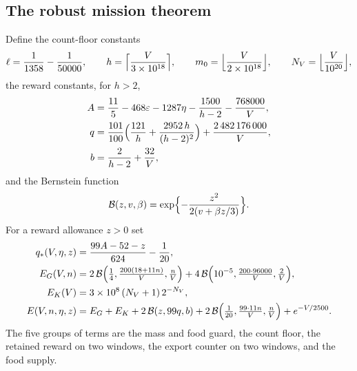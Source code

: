 \documentclass[11pt,letterpaper]{article}
\theoremstyle{plain}
\theoremstyle{definition}
\theoremstyle{remark}
\numberwithin{equation}{section}
\newcommand{\cB}{\mathcal B}
\newcommand{\eps}{\varepsilon}
\begin{document}
\subsection{The robust mission theorem}
Define the count-floor constants
\begin{equation}\label{eq:floorconstants}
 \ell=\frac1{1358}-\frac1{50000},\qquad h=\Bigl\lceil\frac V{3\times10^{18}}\Bigr\rceil,\qquad m_0=\Bigl\lfloor\frac V{2\times10^{18}}\Bigr\rfloor,\qquad N_V=\Bigl\lfloor\frac V{10^{20}}\Bigr\rfloor,
\end{equation}
the reward constants, for $h>2$,
\begin{align}
 A&=\frac{11}5-468\eps-1287\eta-\frac{1500}{h-2}-\frac{768000}{V},\label{eq:A}\\
 q&=\frac{101}{100}\Bigl(\frac{121}{h}+\frac{2952\,h}{(h-2)^2}\Bigr)+\frac{2\,482\,176\,000}{V},\label{eq:q}\\
 b&=\frac2{h-2}+\frac{32}{V},\label{eq:b}
\end{align}
and the Bernstein function
\begin{equation}\label{eq:B}
 \cB(z,v,\beta)=\exp\Bigl\{-\frac{z^2}{2(v+\beta z/3)}\Bigr\}.
\end{equation}
For a reward allowance $z>0$ set
\begin{align}
 q_*(V,\eta,z)&=\frac{99A-52-z}{624}-\frac1{20},\label{eq:quota}\\
 E_G(V,n)&=2\,\cB\Bigl(\tfrac14,\tfrac{200(18+11n)}V,\tfrac nV\Bigr)+4\,\cB\Bigl(10^{-5},\tfrac{200\cdot96000}V,\tfrac2V\Bigr),\label{eq:EG}\\
 E_K(V)&=3\times10^8\,(N_V+1)\,2^{-N_V},\label{eq:EK}\\
 E(V,n,\eta,z)&=E_G+E_K+2\,\cB(z,99q,b)+2\,\cB\Bigl(\tfrac1{20},\tfrac{99\cdot11n}V,\tfrac nV\Bigr)+e^{-V/2500}.\label{eq:E}
\end{align}
The five groups of terms are the mass and food guard, the count floor, the retained reward on two windows, the export counter on two windows, and the food supply.
\end{document}
